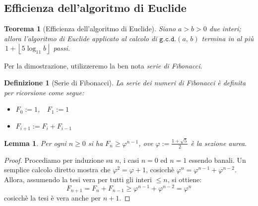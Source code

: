 \documentclass[pdflatex,11pt,a4paper,oneside]{article}
\let\OldEmph\emph
\renewcommand{\emph}[1]{\OldEmph{#1\/}}
\let\gold=\varphi
\newcommand{\floor}[1]{\left\lfloor{#1}\right\rfloor}
\newcommand{\gcdop}[0]{\ensuremath{\mathtt{g.c.d.}}}
\newcommand{\xgcd}[1]{\ensuremath{\gcdop\left({#1}\right)}}
\renewcommand{\gcd}[2]{\xgcd{{#1},\,{#2}}}
\newtheorem{theorem}[TheoremLike]{Teorema}
\newtheorem{definition}[TheoremLike]{Definizione}
\newtheorem{lemma}[TheoremLike]{Lemma}
\begin{document}

\subsection{Efficienza dell'algoritmo di Euclide}

\begin{theorem}[Efficienza dell'algoritmo di Euclide]
Siano $a > b > 0$ due interi; allora l'algoritmo di Euclide
applicato al calcolo di $\gcd{a}{b}$ termina in al pi\`u
\,$1 + \floor{5 \log_{11} b}$ passi.
\end{theorem}

\smallskip
\noindent
Per la dimostrazione, utilizzeremo la ben nota \emph{serie di Fibonacci}.

\begin{definition}[Serie di Fibonacci]
La serie dei numeri di Fibonacci \`e definita per ricorsione come segue:
  \begin{itemize}
    \item $F_0 := 1$,~~$F_1 := 1$
    \item $F_{i+1} := F_i + F_{i-1}$
  \end{itemize}
\end{definition}

\begin{lemma}
Per ogni $n \geq 0$ si ha $F_n \geq \gold^{n-1}$, ove $\gold :=
\frac{1 + \sqrt{5}}{2}$ \`e la sezione aurea.
\end{lemma}
%
\begin{proof}
Procediamo per induzione su $n$, i casi $n = 0$ ed $n = 1$ essendo banali.
Un semplice calcolo diretto mostra che $\gold^2 = \gold + 1$, cosicch\`e
$\gold^{n} = \gold^{n-1} + \gold^{n-2}$.  Allora, assumendo la tesi vera
per tutti gli interi $\leq n$, si ottiene:
  $$F_{n+1} = F_n + F_{n-1} \geq \gold^{n-1} + \gold^{n-2} = \gold^{n}$$
cosicch\`e la tesi \`e vera anche per $n + 1$.
\end{proof}
\end{document}
